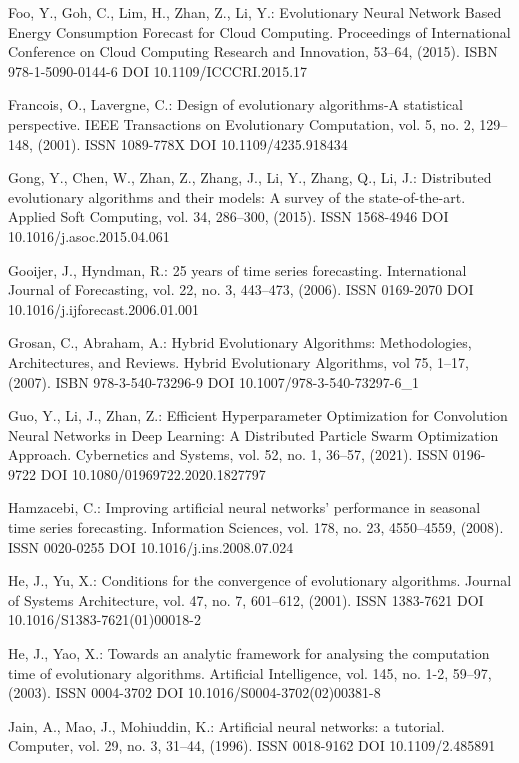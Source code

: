 \begin{thebibliography}{99.}
 Foo, Y., Goh, C., Lim, H., Zhan, Z., Li, Y.: Evolutionary Neural Network Based Energy Consumption Forecast for Cloud Computing. Proceedings of International Conference on Cloud Computing Research and Innovation, 53--64, (2015). ISBN 978-1-5090-0144-6 DOI 10.1109/ICCCRI.2015.17

 Francois, O., Lavergne, C.: Design of evolutionary algorithms-A statistical perspective. IEEE Transactions on Evolutionary Computation, vol. 5, no. 2, 129--148, (2001). ISSN 1089-778X DOI 10.1109/4235.918434

 Gong, Y., Chen, W., Zhan, Z., Zhang, J., Li, Y., Zhang, Q., Li, J.: Distributed evolutionary algorithms and their models: A survey of the state-of-the-art. Applied Soft Computing, vol. 34, 286--300, (2015). ISSN 1568-4946 DOI 10.1016/j.asoc.2015.04.061

 Gooijer, J., Hyndman, R.: 25 years of time series forecasting. International Journal of Forecasting, vol. 22, no. 3, 443--473, (2006). ISSN 0169-2070 DOI 10.1016/j.ijforecast.2006.01.001

 Grosan, C., Abraham, A.: Hybrid Evolutionary Algorithms: Methodologies, Architectures, and Reviews. Hybrid Evolutionary Algorithms, vol 75, 1--17, (2007). ISBN 978-3-540-73296-9 DOI 10.1007/978-3-540-73297-6\_1

 Guo, Y., Li, J., Zhan, Z.: Efficient Hyperparameter Optimization for Convolution Neural Networks in Deep Learning: A Distributed Particle Swarm Optimization Approach. Cybernetics and Systems, vol. 52, no. 1, 36--57, (2021). ISSN 0196-9722 DOI 10.1080/01969722.2020.1827797

 Hamzacebi, C.: Improving artificial neural networks’ performance in seasonal time series forecasting. Information Sciences, vol. 178, no. 23, 4550--4559, (2008). ISSN 0020-0255 DOI 10.1016/j.ins.2008.07.024

 He, J., Yu, X.: Conditions for the convergence of evolutionary algorithms. Journal of Systems Architecture, vol. 47, no. 7, 601--612, (2001). ISSN 1383-7621 DOI 10.1016/S1383-7621(01)00018-2

 He, J., Yao, X.: Towards an analytic framework for analysing the computation time of evolutionary algorithms. Artificial Intelligence, vol. 145, no. 1-2, 59--97, (2003). ISSN 0004-3702 DOI 10.1016/S0004-3702(02)00381-8

 Jain, A., Mao, J., Mohiuddin, K.: Artificial neural networks: a tutorial. Computer, vol. 29, no. 3, 31--44, (1996). ISSN 0018-9162 DOI 10.1109/2.485891


\end{thebibliography}
